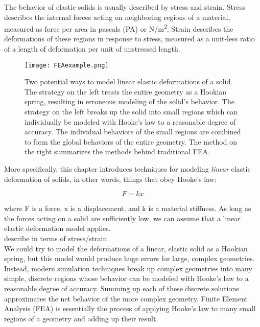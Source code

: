{The behavior of elastic solids is usually described by stress and strain.  Stress describes the internal forces acting on neighboring regions of a material, measured as force per area in pascals (PA) or N/m\textsuperscript{2}.  Strain describes the deformations of these regions in response to stress, measured as a unit-less ratio of a length of deformation per unit of unstressed length.\\

\begin{figure}
  \texttt{[image: FEAexample.png]}
  \caption{Two potential ways to model linear elastic deformations of a solid.  The strategy on the left treats the entire geometry as a Hookian spring, resulting in erroneous modeling of the solid's behavior.  The strategy on the left breaks up the solid into small regions which can individually be modeled with Hooke's law to a reasonable degree of accuracy.  The individual behaviors of the small regions are combined to form the global behaviors of the entire geometry.  The method on the right summarizes the methods behind traditional FEA.}
  \label{fig:FEAexample}
\end{figure}

More specifically, this chapter introduces techniques for modeling \textit{linear} elastic deformation of solids, in other words, things that obey Hooke's law:

\[F = kx\]

where F is a force, x is a displacement, and k is a material stiffness.  As long as the forces acting on a solid are sufficiently low, we can assume that a linear elastic deformation model applies.\\

describe in terms of stress/strain\\

We could try to model the deformations of a linear, elastic solid as a Hookian spring, but this model would produce huge errors for large, complex geometries.  Instead, modern simulation techniques break up complex geometries into many simple, discrete regions whose behavior can be modeled with Hooke's law to a reasonable degree of accuracy.  Summing up each of these discrete solutions approximates the net behavior of the more complex geometry.  Finite Element Analysis (FEA) is essentially the process of applying Hooke's law to many small regions of a geometry and adding up their result.\\






}
